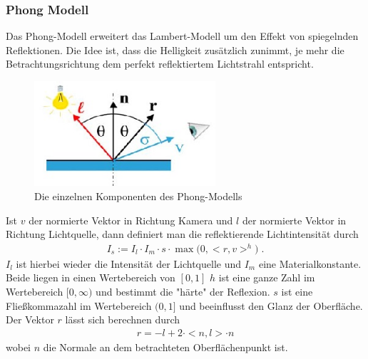    
\subsubsection{Phong Modell}
Das Phong-Modell erweitert das  Lambert-Modell um den Effekt von spiegelnden Reflektionen. Die Idee ist, dass die Helligkeit zusätzlich zunimmt, je mehr die Betrachtungsrichtung dem perfekt reflektiertem Lichtstrahl entspricht.  

\begin{figure}[H]
    \centering
    \includegraphics[width=0.6\textwidth]{images/phong_directions.jpg}
    \caption{Die einzelnen Komponenten des Phong-Modells}
    \label{fig:phong-directions}
\end{figure}

Ist $v$ der normierte Vektor in Richtung Kamera und $l$ der normierte Vektor in Richtung Lichtquelle, dann definiert man die  reflektierende Lichtintensität durch
\begin{align}
I_s := I_l \cdot I_m \cdot s \cdot \max\biggl ( 0, <r,v>^h \biggr)\;.
\end{align}
$I_l$ ist hierbei wieder die Intensität der Lichtquelle und $I_m$ eine Materialkonstante. Beide liegen in einen Wertebereich von $[0,1]$ 
$h$ ist eine ganze Zahl im Wertebereich $[0, \infty)$ und bestimmt die "härte" der Reflexion. $s$ ist eine Fließkommazahl im Wertebereich $(0,1]$ und beeinflusst den Glanz der Oberfläche.
 Der Vektor $r$ lässt sich berechnen durch 
\begin{align}
r = -l + 2 \cdot <n, l> \cdot n
\end{align}
wobei $n$ die Normale an dem betrachteten Oberflächenpunkt ist.

